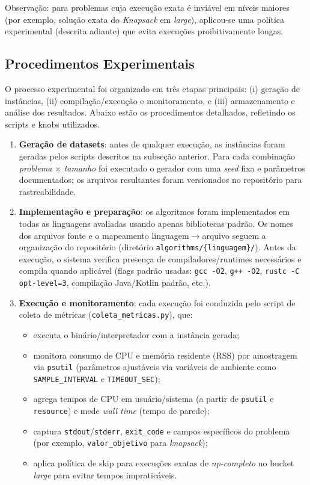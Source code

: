 \documentclass[12pt,a4paper]{article}
\newcommand{\eng}[1]{\textit{#1}}
\begin{document}
Observação: para problemas cuja execução exata é inviável em níveis maiores (por exemplo, solução exata do \eng{Knapsack} em \eng{large}), aplicou-se uma política experimental (descrita adiante) que evita execuções proibitivamente longas.

\subsection{Procedimentos Experimentais}
O processo experimental foi organizado em três etapas principais: (i) geração de instâncias, (ii) compilação/execução e monitoramento, e (iii) armazenamento e análise dos resultados. Abaixo estão os procedimentos detalhados, refletindo os scripts e knobs utilizados.

\begin{enumerate}
  \item \textbf{Geração de datasets}: antes de qualquer execução, as instâncias foram geradas pelos scripts descritos na subseção anterior. Para cada combinação \eng{problema} $\times$ \eng{tamanho} foi executado o gerador com uma \emph{seed} fixa e parâmetros documentados; os arquivos resultantes foram versionados no repositório para rastreabilidade.

  \item \textbf{Implementação e preparação}: os algoritmos foram implementados em todas as linguagens avaliadas usando apenas bibliotecas padrão. Os nomes dos arquivos fonte e o mapeamento linguagem$\to$arquivo seguem a organização do repositório (diretório \texttt{algorithms/\{linguagem\}/}). Antes da execução, o sistema verifica presença de compiladores/runtimes necessários e compila quando aplicável (flags padrão usadas: \texttt{gcc -O2}, \texttt{g++ -O2}, \texttt{rustc -C opt-level=3}, compilação Java/Kotlin padrão, etc.).

  \item \textbf{Execução e monitoramento}: cada execução foi conduzida pelo script de coleta de métricas (\texttt{coleta\_metricas.py}), que:
    \begin{itemize}
      \item executa o binário/interpretador com a instância gerada;
      \item monitora consumo de CPU e memória residente (RSS) por amostragem via \texttt{psutil} (parâmetros ajustáveis via variáveis de ambiente como \texttt{SAMPLE\_INTERVAL} e \texttt{TIMEOUT\_SEC});
      \item agrega tempos de CPU em usuário/sistema (a partir de \texttt{psutil} e \texttt{resource}) e mede \eng{wall time} (tempo de parede);
      \item captura \texttt{stdout}/\texttt{stderr}, \texttt{exit\_code} e campos específicos do problema (por exemplo, \texttt{valor\_objetivo} para \eng{knapsack});
      \item aplica política de skip para execuções exatas de \eng{np-completo} no bucket \eng{large} para evitar tempos impraticáveis.
    \end{itemize}


\end{enumerate}
\end{document}
